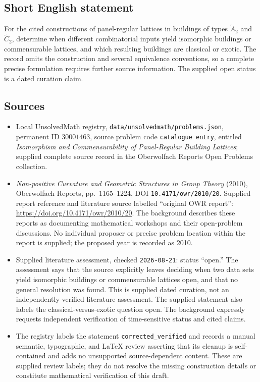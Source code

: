 \documentclass[11pt]{article}
\begin{document}
\subsection{Short English statement}
For the cited constructions of panel-regular lattices in buildings of types \(\widetilde{A}_2\) and \(\widetilde{C}_2\), determine when different combinatorial inputs yield isomorphic buildings or commensurable lattices, and which resulting buildings are classical or exotic. The record omits the construction and several equivalence conventions, so a complete precise formulation requires further source information. The supplied open status is a dated curation claim.
\subsection{Sources}
\begin{itemize}
\item Local UnsolvedMath registry, \texttt{data/unsolvedmath/problems.json}, permanent ID \(30001463\), source problem code \texttt{catalogue entry}, entitled \emph{Isomorphism and Commensurability of Panel-Regular Building Lattices}; supplied complete source record in the Oberwolfach Reports Open Problems collection.
\item \emph{Non-positive Curvature and Geometric Structures in Group Theory} (2010), Oberwolfach Reports, pp.\ 1165--1224, DOI \texttt{10.4171/owr/2010/20}. Supplied report reference and literature source labelled ``original OWR report'': \url{https://doi.org/10.4171/owr/2010/20}. The background describes these reports as documenting mathematical workshops and their open-problem discussions. No individual proposer or precise problem location within the report is supplied; the proposed year is recorded as 2010.
\item Supplied literature assessment, checked \texttt{2026-08-21}: status ``open.'' The assessment says that the source explicitly leaves deciding when two data sets yield isomorphic buildings or commensurable lattices open, and that no general resolution was found. This is supplied dated curation, not an independently verified literature assessment. The supplied statement also labels the classical-versus-exotic question open. The background expressly requests independent verification of time-sensitive status and cited claims.
\item The registry labels the statement \texttt{corrected\_verified} and records a manual semantic, typographic, and LaTeX review asserting that its cleanup is self-contained and adds no unsupported source-dependent content. These are supplied review labels; they do not resolve the missing construction details or constitute mathematical verification of this draft.
\end{itemize}
\end{document}
